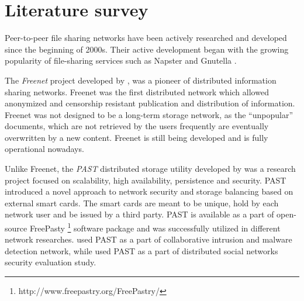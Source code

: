 \section{Literature survey}

Peer-to-peer file sharing networks have been actively researched and
developed since the beginning of 2000s. Their active development began
with the growing popularity of file-sharing services such as Napster
\citep{napster} and Gnutella \citep{gnutella}.

The \emph{Freenet} project developed by \citet{freenet}, was
a pioneer of distributed information sharing networks.
Freenet was the first distributed network which allowed anonymized
and censorship resistant publication and distribution of information.
Freenet was not designed to be a long-term storage network, as
the ``unpopular'' documents, which are not retrieved by the
users frequently are eventually overwritten by a new content.
Freenet is still being developed and is fully operational nowadays.

Unlike Freenet, the \emph{PAST} distributed storage utility
developed by \citet{past} was a research project focused
on scalability, high availability, persistence
and security. PAST introduced a novel approach to \pp network
security and storage balancing based on external smart cards.
The smart cards are meant to be unique, hold by each network
user and be issued by a third party.
PAST is available as a part of open-source FreePasty
\footnote{http://www.freepastry.org/FreePastry/} software package
and was successfully utilized in different \pp network researches.
\citet{p2p-intrusion} used PAST as a part of \pp collaborative
intrusion and malware detection network, while
\citet{p2p-social-security} used PAST as a part of distributed
social networks security evaluation study.

